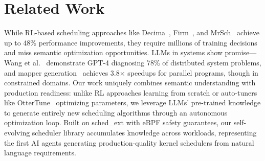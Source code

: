 \section{Related Work}
\label{sec:related}

While RL-based scheduling approaches like Decima~\cite{mao2019decima}, Firm~\cite{qiu2020firm}, and MrSch~\cite{zhang2024mrsch} achieve up to 48\% performance improvements, they require millions of training decisions and miss semantic optimization opportunities. LLMs in systems show promise—Wang et al.~\cite{wang2024llmsys} demonstrate GPT-4 diagnosing 78\% of distributed system problems, and mapper generation~\cite{wei2024mapper} achieves 3.8× speedups for parallel programs, though in constrained domains. Our work uniquely combines semantic understanding with production readiness: unlike RL approaches learning from scratch or auto-tuners like OtterTune~\cite{vanaken2017ottertune} optimizing parameters, we leverage LLMs' pre-trained knowledge to generate entirely new scheduling algorithms through an autonomous optimization loop. Built on sched\_ext with eBPF safety guarantees, our self-evolving scheduler library accumulates knowledge across workloads, representing the first AI agents generating production-quality kernel schedulers from natural language requirements.